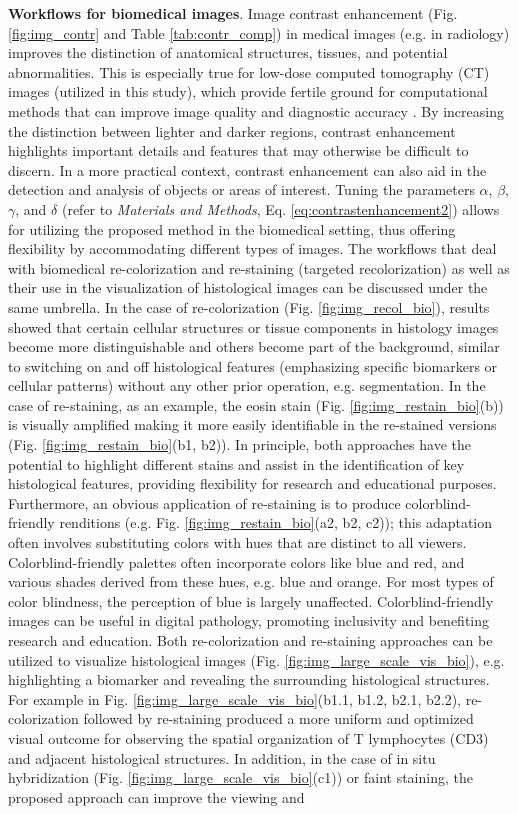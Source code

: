 \documentclass[superscriptaddress,longbibliography,aps,prl,twocolumn,10pt]{revtex4-2}
\begin{document}
\noindent
\textbf{Workflows for biomedical images}. Image contrast enhancement (Fig. \ref{fig:img_contr} and Table \ref{tab:contr_comp}) in medical images (e.g. in radiology) improves the distinction of anatomical structures, tissues, and potential abnormalities. This is especially true for low-dose computed tomography (CT) images (utilized in this study), which provide fertile ground for computational methods that can improve image quality and diagnostic accuracy \cite{Shi2016}. By increasing the distinction between lighter and darker regions, contrast enhancement highlights important details and features that may otherwise be difficult to discern. In a more practical context, contrast enhancement can also aid in the detection and analysis of objects or areas of interest. Tuning the parameters $\alpha$, $\beta$, $\gamma$, and $\delta$ (refer to \textit{Materials and Methods}, Eq. \ref{eq:contrastenhancement2}) allows for utilizing the proposed method in the biomedical setting, thus offering flexibility by accommodating different types of images. The workflows that deal with biomedical re-colorization and re-staining (targeted recolorization) as well as their use in the visualization of histological images can be discussed under the same umbrella. In the case of re-colorization (Fig. \ref{fig:img_recol_bio}), results showed that certain cellular structures or tissue components in histology images become more distinguishable and others become part of the background, similar to switching on and off histological features (emphasizing specific biomarkers or cellular patterns) without any other prior operation, e.g. segmentation. In the case of re-staining, as an example, the eosin stain (Fig. \ref{fig:img_restain_bio}(b)) is visually amplified making it more easily identifiable in the re-stained versions (Fig. \ref{fig:img_restain_bio}(b1, b2)). In principle, both approaches have the potential to highlight different stains and assist in the identification of key histological features, providing flexibility for research and educational purposes. Furthermore, an obvious application of re-staining is to produce colorblind-friendly renditions (e.g. Fig. \ref{fig:img_restain_bio}(a2, b2, c2)); this adaptation often involves substituting colors with hues that are distinct to all viewers. Colorblind-friendly palettes often incorporate colors like blue and red, and various shades derived from these hues, e.g. blue and orange. For most types of color blindness, the perception of blue is largely unaffected. Colorblind-friendly images can be useful in digital pathology, promoting inclusivity and benefiting research and education. Both re-colorization and re-staining approaches can be utilized to visualize histological images (Fig. \ref{fig:img_large_scale_vis_bio}), e.g. highlighting a biomarker and revealing the surrounding histological structures. For example in Fig. \ref{fig:img_large_scale_vis_bio}(b1.1, b1.2, b2.1, b2.2), re-colorization followed by re-staining produced a more uniform and optimized visual outcome for observing the spatial organization of T lymphocytes (CD3) and adjacent histological structures. In addition, in the case of in situ hybridization (Fig. \ref{fig:img_large_scale_vis_bio}(c1)) or faint staining, the proposed approach can improve the viewing and 
\end{document}
